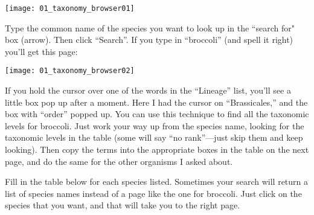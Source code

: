 \documentclass[11pt]{exam}
\begin{document}
\begin{center}
	\texttt{[image: 01\_taxonomy\_browser01]}
\end{center}

Type the common name of the species you want to look up in the “search
for" box (arrow). Then click “Search”. If you type in “broccoli” (and spell it right) you'll get
this page:



\begin{center}
	\texttt{[image: 01\_taxonomy\_browser02]}
\end{center}

If you hold the cursor over one of the words in the “Lineage” list,
you'll see a little box pop up after a moment. Here I had the cursor on
“Brassicales,” and the box with “order” popped up. You
can use this technique to find all the taxonomic levels for broccoli. 
Just work your way up from the species name, looking for the taxonomic
levels in the table (some will say “no rank”—just skip them and
keep looking). Then copy the terms into the appropriate boxes in the
table on the next page, and do the same for the other organisms I asked about.

\newpage

Fill in the table below for each species listed. Sometimes your search
will return a list of species names instead of a page like the
one for broccoli. Just click on the species that you want, and that
will take you to the right page.

\end{document}
